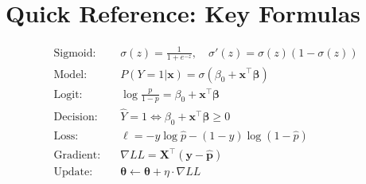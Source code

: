 \documentclass[main.tex]{subfiles}
\begin{document}
\section{Quick Reference: Key Formulas}

\begin{align*}
\text{Sigmoid:} \quad & \sigma(z) = \frac{1}{1 + e^{-z}}, \quad \sigma'(z) = \sigma(z)(1-\sigma(z)) \\[6pt]
\text{Model:} \quad & P(Y=1|\mathbf{x}) = \sigma(\beta_0 + \mathbf{x}^\top\boldsymbol{\beta}) \\[6pt]
\text{Logit:} \quad & \log\frac{p}{1-p} = \beta_0 + \mathbf{x}^\top\boldsymbol{\beta} \\[6pt]
\text{Decision:} \quad & \hat{Y} = 1 \iff \beta_0 + \mathbf{x}^\top\boldsymbol{\beta} \geq 0 \\[6pt]
\text{Loss:} \quad & \ell = -y\log\hat{p} - (1-y)\log(1-\hat{p}) \\[6pt]
\text{Gradient:} \quad & \nabla LL = \mathbf{X}^\top(\mathbf{y} - \hat{\mathbf{p}}) \\[6pt]
\text{Update:} \quad & \boldsymbol{\theta} \leftarrow \boldsymbol{\theta} + \eta \cdot \nabla LL
\end{align*}
\end{document}
